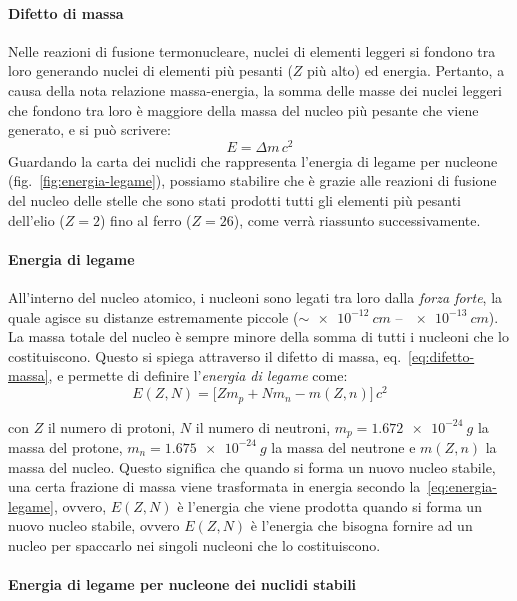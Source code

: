 \paragraph{Difetto di massa}
Nelle reazioni di fusione termonucleare, nuclei di elementi leggeri si fondono tra loro generando nuclei di elementi più pesanti ($Z$ più alto) ed energia. Pertanto, a causa della nota relazione massa-energia, la somma delle masse dei nuclei leggeri che fondono tra loro è maggiore della massa del nucleo più pesante che viene generato, e si può scrivere:
\begin{equation}\label{eq:difetto-massa}
    E = \Delta m \, c^2
\end{equation}
Guardando la carta dei nuclidi che rappresenta l'energia di legame per nucleone (fig.~\ref{fig:energia-legame}), possiamo stabilire che è grazie alle reazioni di fusione del nucleo delle stelle che sono stati prodotti tutti gli elementi più pesanti dell'elio ($Z=2$) fino al ferro ($Z=26$), come verrà riassunto successivamente.

\paragraph{Energia di legame}
All'interno del nucleo atomico, i nucleoni sono legati tra loro dalla \emph{forza forte}, la quale agisce su distanze estremamente piccole ($\sim \SI{e-12}{cm}$ -- $\SI{e-13}{cm}$). La massa totale del nucleo è sempre minore della somma di tutti i nucleoni che lo costituiscono. Questo si spiega attraverso il difetto di massa, eq.~\eqref{eq:difetto-massa}, e permette di definire l'\emph{energia di legame} come:
\begin{equation}\label{eq:energia-legame}
    E(Z,N) = \bigl[ Z m_p + N m_n - m(Z,n) \bigr] \, c^2
\end{equation}

con $Z$ il numero di protoni, $N$ il numero di neutroni, $m_p = \SI{1.672e-24}{g}$ la massa del protone, $m_n = \SI{1.675e-24}{g}$ la massa del neutrone e $m(Z,n)$ la massa del nucleo. Questo significa che quando si forma un nuovo nucleo stabile, una certa frazione di massa viene trasformata in energia secondo la~\eqref{eq:energia-legame}, ovvero, $E(Z,N)$ è l'energia che viene prodotta quando si forma un nuovo nucleo stabile, ovvero $E(Z,N)$ è l'energia che bisogna fornire ad un nucleo per spaccarlo nei singoli nucleoni che lo costituiscono.

\paragraph{Energia di legame per nucleone dei nuclidi stabili}

